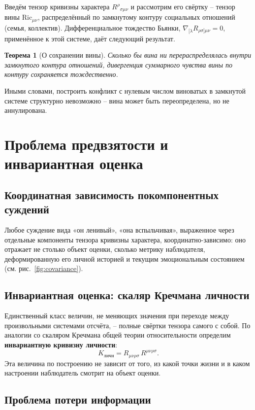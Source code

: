 \documentclass[11pt,a4paper]{article}
\newtheorem{theorem}{Теорема}
\begin{document}
Введём тензор кривизны характера $R^{\rho}{}_{\sigma\mu\nu}$ и рассмотрим его свёртку -- тензор вины $\mathrm{Ric}_{\mu\nu}$, распределённый по замкнутому контуру социальных отношений (семья, коллектив). Дифференциальное тождество Бьянки, $\nabla_{[\lambda}R_{\rho\sigma]\mu\nu}=0$, применённое к этой системе, даёт следующий результат.

\begin{theorem}[О сохранении вины]
Сколько бы вина ни перераспределялась внутри замкнутого контура отношений, дивергенция суммарного чувства вины по контуру сохраняется тождественно.
\end{theorem}

Иными словами, построить конфликт с нулевым числом виноватых в замкнутой системе структурно невозможно -- вина может быть переопределена, но не аннулирована.

\section{Проблема предвзятости и инвариантная оценка}

\subsection{Координатная зависимость покомпонентных суждений}

Любое суждение вида «он ленивый», «она вспыльчивая», выраженное через отдельные компоненты тензора кривизны характера, координатно-зависимо: оно отражает не столько объект оценки, сколько метрику наблюдателя, деформированную его личной историей и текущим эмоциональным состоянием (см. рис.~\ref{fig:covariance}).

\subsection{Инвариантная оценка: скаляр Кречмана личности}

Единственный класс величин, не меняющих значения при переходе между произвольными системами отсчёта, -- полные свёртки тензора самого с собой. По аналогии со скаляром Кречмана общей теории относительности определим \textbf{инвариантную кривизну личности}:
\[
K_{\text{личн}} = R_{\mu\nu\rho\sigma}\,R^{\mu\nu\rho\sigma}.
\]
Эта величина по построению не зависит от того, из какой точки жизни и в каком настроении наблюдатель смотрит на объект оценки.

\subsection{Проблема потери информации}
\end{document}
